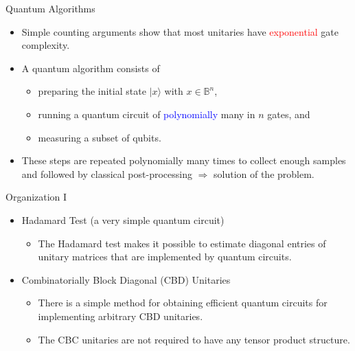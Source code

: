 \documentclass[slideColor]{prosper}
\renewcommand{\>}{\rangle}
\newcommand{\<}{\langle}
\begin{document}

\begin{slide}{Quantum Algorithms}

\begin{itemize}
\item Simple counting arguments show that most unitaries have \textcolor{red}{exponential} gate complexity.

\medskip
\item A quantum algorithm consists of 

\medskip
\begin{itemize}
\item preparing the initial state $|x\>$ with $x\in\mathbb{B}^n$,

\bigskip
\item running a quantum circuit of \textcolor{blue}{polynomially} many in $n$ gates, and

\bigskip
\item measuring a subset of qubits.
\end{itemize}

\medskip
\item These steps are repeated polynomially many times to collect enough samples and followed by classical post-processing $\Longrightarrow$ solution of the problem.
\end{itemize}

\end{slide}




\begin{slide}{Organization I}
\begin{itemize}
\item Hadamard Test (a very simple quantum circuit)

\medskip
\begin{itemize}
\item The Hadamard test makes it possible to estimate diagonal entries of unitary matrices that are implemented by quantum circuits.
\end{itemize}

\medskip
\item Combinatorially Block Diagonal (CBD) Unitaries

\medskip
\begin{itemize}
\item There is a simple method for obtaining efficient quantum circuits for implementing arbitrary CBD unitaries.

\medskip
\item The CBC unitaries are not required to have any tensor product structure.
\end{itemize}
\end{itemize}

\end{slide}
\end{document}
